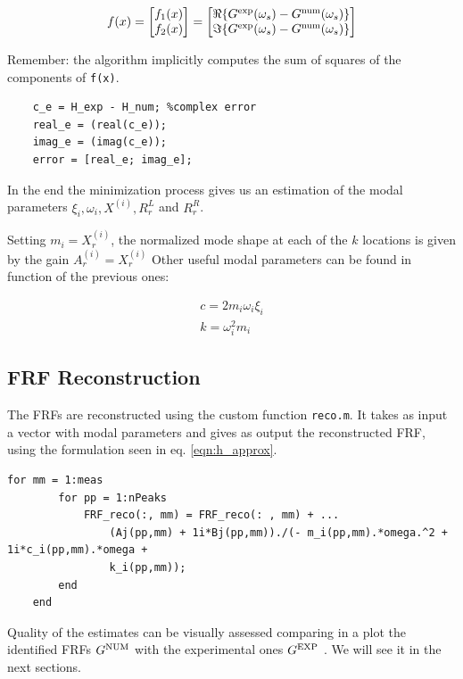 \documentclass[a4paper,12pt,oneside]{article}
\begin{document}
\[
	f(x) = 
		\begin{bmatrix}
			f_1 (x) \\
			f_2 (x)
		\end{bmatrix} =		\begin{bmatrix} 
										\Re\{G^\textup{exp}(\omega_s) - G^\textup{num}(\omega_s)\} \\
										\Im\{G^\textup{exp}(\omega_s) - G^\textup{num}(\omega_s)\}  
									\end{bmatrix}
\]

Remember: the algorithm implicitly computes the sum of squares of the components of \lstinline!f(x)!.

\begin{lstlisting}[caption = {Snippet of code from \texttt{err\_i.m}}]
	% error computation
	c_e = H_exp - H_num; %complex error
	real_e = (real(c_e));
	imag_e = (imag(c_e));
	error = [real_e; imag_e];
\end{lstlisting}

In the end the minimization process gives us an estimation of the modal parameters $ \xi_i, \omega_i, X^{(i)}, R_r^L $ and $ R_r^R $.

Setting $ m_i = X_r^{(i)} $, the normalized mode shape at each of the $ k $ locations is given by the gain $ A_r^{(i)} = X_r^{(i)} $
Other useful modal parameters can be found in function of the previous ones:

\begin{gather*}
	c = 2 m_i \omega_i \xi_i \\
	k = \omega_i^2 m_i
\end{gather*}

\subsection{FRF Reconstruction}
The FRFs are reconstructed using the custom function \lstinline!reco.m!. It takes as input a vector with modal parameters and gives as output the reconstructed FRF, using the formulation seen in eq. \ref{eqn:h_approx}.

\begin{lstlisting}[caption = {Snippet of code from \texttt{reco.m}}]
	for mm = 1:meas
		for pp = 1:nPeaks
			FRF_reco(:, mm) = FRF_reco(: , mm) + ...
				(Aj(pp,mm) + 1i*Bj(pp,mm))./(- m_i(pp,mm).*omega.^2 + 1i*c_i(pp,mm).*omega +
				k_i(pp,mm));
		end
	end
\end{lstlisting}

Quality of the estimates can be visually assessed comparing in a plot the
identified FRFs $ G^\textup{NUM} $ with the experimental ones $ G^\textup{EXP} $ . We will see it in the next sections.
\end{document}
